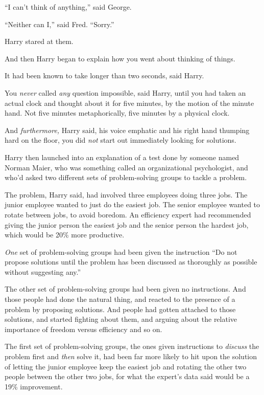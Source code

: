 ``I can't think of anything,'' said George.

``Neither can I,'' said Fred. ``Sorry.''

Harry stared at them.

And then Harry began to explain how you went about thinking of things.

It had been known to take longer than two seconds, said Harry.

You \emph{never} called \emph{any} question impossible, said Harry,
until you had taken an actual clock and thought about it for five
minutes, by the motion of the minute hand. Not five minutes
metaphorically, five minutes by a physical clock.

And \emph{furthermore,} Harry said, his voice emphatic and his right
hand thumping hard on the floor, you did \emph{not} start out
immediately looking for solutions.

Harry then launched into an explanation of a test done by someone named
Norman Maier, who was something called an organizational psychologist,
and who'd asked two different sets of problem-solving groups to tackle a
problem.

The problem, Harry said, had involved three employees doing three jobs.
The junior employee wanted to just do the easiest job. The senior
employee wanted to rotate between jobs, to avoid boredom. An efficiency
expert had recommended giving the junior person the easiest job and the
senior person the hardest job, which would be 20\% more productive.

\emph{One} set of problem-solving groups had been given the instruction
``Do not propose solutions until the problem has been discussed as
thoroughly as possible without suggesting any.''

The other set of problem-solving groups had been given no instructions.
And those people had done the natural thing, and reacted to the presence
of a problem by proposing solutions. And people had gotten attached to
those solutions, and started fighting about them, and arguing about the
relative importance of freedom versus efficiency and so on.

The first set of problem-solving groups, the ones given instructions to
\emph{discuss} the problem first and \emph{then} solve it, had been far
more likely to hit upon the solution of letting the junior employee keep
the easiest job and rotating the other two people between the other two
jobs, for what the expert's data said would be a 19\% improvement.

